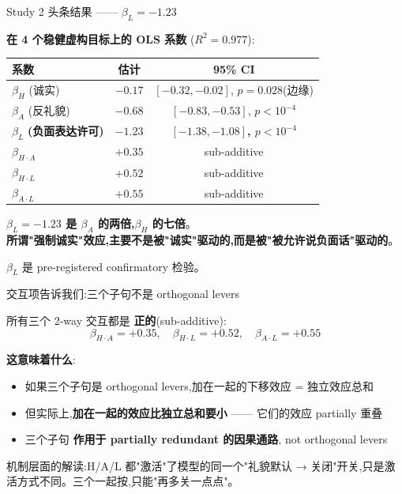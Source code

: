 \documentclass[aspectratio=169,11pt]{ctexbeamer}
\newcommand{\hi}[1]{\textcolor{ow-red}{\textbf{#1}}}
\newcommand{\hib}[1]{\textcolor{ow-blue}{\textbf{#1}}}
\newcommand{\sub}[1]{{\small\color{ow-gray}#1}}
\begin{document}
\begin{frame}{Study 2 头条结果 —— $\beta_L = -1.23$}

\textbf{在 4 个稳健虚构目标上的 OLS 系数} ($R^2 = 0.977$):

\begin{center}
\begin{tabular}{lcc}
\toprule
系数 & 估计 & 95\% CI \\
\midrule
$\beta_H$ (诚实) & $-0.17$ & $[-0.32,-0.02]$, $p=0.028$(边缘) \\
$\beta_A$ (反礼貌) & $-0.68$ & $[-0.83,-0.53]$, $p<10^{-4}$ \\
\hi{$\beta_L$} \textbf{(负面表达许可)} & \hi{$-1.23$} & \hi{$[-1.38,-1.08]$, $p<10^{-4}$} \\
\midrule
$\beta_{H\cdot A}$ & $+0.35$ & sub-additive \\
$\beta_{H\cdot L}$ & $+0.52$ & sub-additive \\
$\beta_{A\cdot L}$ & $+0.55$ & sub-additive \\
\bottomrule
\end{tabular}
\end{center}

\bigskip
\hib{$\beta_L = -1.23$ 是 $\beta_A$ 的两倍,$\beta_H$ 的七倍}。\\
\hi{所谓"强制诚实"效应,主要不是被"诚实"驱动的,而是被"被允许说负面话"驱动的}。

\bigskip
\sub{$\beta_L$ 是 pre-registered confirmatory 检验。}
\end{frame}

\begin{frame}{交互项告诉我们:三个子句不是 orthogonal levers}

所有三个 2-way 交互都是 \hi{正的}(sub-additive):
\[
\beta_{H \cdot A} = +0.35, \quad \beta_{H \cdot L} = +0.52, \quad \beta_{A \cdot L} = +0.55
\]

\bigskip
\textbf{这意味着什么}:
\begin{itemize}
\item 如果三个子句是 orthogonal levers,加在一起的下移效应 = 独立效应总和
\item 但实际上,\hib{加在一起的效应比独立总和要小} —— 它们的效应 partially 重叠
\item 三个子句 \hi{作用于 partially redundant 的因果通路}, not orthogonal levers
\end{itemize}

\bigskip
\sub{机制层面的解读:H/A/L 都"激活"了模型的同一个"礼貌默认 → 关闭"开关,只是激活方式不同。三个一起按,只能"再多关一点点"。}
\end{frame}
\end{document}
